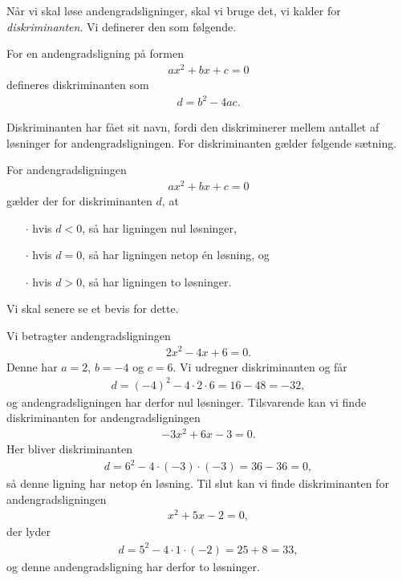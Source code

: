 \documentclass[12pt]{article}
\begin{document}
Når vi skal løse andengradsligninger, skal vi bruge det, vi kalder for \textit{diskriminanten}. Vi definerer den som følgende.
\begin{defn}[Diskriminanten]
	For en andengradsligning på formen
	\begin{align*}
		ax^2 + bx + c = 0
	\end{align*}
	defineres diskriminanten som
	\begin{align*}
		d = b^2 - 4ac.
	\end{align*}
\end{defn}
Diskriminanten har fået sit navn, fordi den diskriminerer mellem antallet af løsninger for andengradsligningen. For diskriminanten gælder følgende sætning.
\begin{setn}
	For andengradsligningen
	\begin{align*}
		ax^2 + bx + c = 0
	\end{align*}
	gælder der for diskriminanten $d$, at 
	\begin{itemize}
		\item[$\cdot$] hvis $d < 0$, så har ligningen nul løsninger,
		\item[$\cdot$] hvis $d = 0$, så har ligningen netop én løsning, og 
		\item[$\cdot$] hvis $d > 0$, så har ligningen to løsninger. 
	\end{itemize}
\end{setn}
Vi skal senere se et bevis for dette. 
\begin{exa}
	Vi betragter andengradsligningen
	\begin{align*}
		2x^2 - 4x + 6 = 0.
	\end{align*}
	Denne har $a = 2$, $b = -4$ og $c = 6$. Vi udregner diskriminanten og får
	\begin{align*}
		d = (-4)^2 - 4\cdot 2 \cdot 6 = 16 - 48 = -32, 
	\end{align*}
	og andengradsligningen har derfor nul løsninger. 
	Tilsvarende kan vi finde diskriminanten for andengradsligningen
	\begin{align*}
		-3x^2 + 6x - 3 = 0.
	\end{align*}
	Her bliver diskriminanten
	\begin{align*}
		d = 6^2 - 4\cdot (-3)\cdot (-3) = 36 - 36 = 0,
	\end{align*}
	så denne ligning har netop én løsning. 
	Til slut kan vi finde diskriminanten for andengradsligningen
	\begin{align*}
		x^2 + 5x - 2 = 0,
	\end{align*}
	der lyder
	\begin{align*}
		d = 5^2 - 4\cdot 1 \cdot (-2) = 25 + 8 = 33,
	\end{align*}
	og denne andengradsligning har derfor to løsninger. 
\end{exa}
\end{document}
